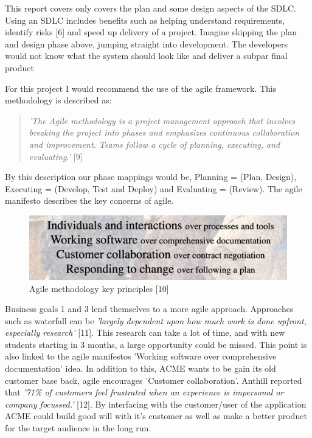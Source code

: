   This report covers only covers the plan and some design aspects of the SDLC. Using an SDLC includes benefits such as helping understand requirements,
  identify risks [6] and speed up delivery of a project. Imagine skipping the plan and design phase above, jumping straight into development. The developers
  would not know what the system should look like and deliver a subpar final product

  For this project I would recommend the use of the agile framework. This methodology is described as:
  \begin{quote}
    \textit{'The Agile methodology is a project management approach that involves breaking the project into phases and emphasizes continuous collaboration and 
    improvement. Teams follow a cycle of planning, executing, and evaluating.'} [9]
  \end{quote}

  By this description our phase mappings would be, Planning = (Plan, Design), Executing = (Develop, Test and Deploy) and Evaluating = (Review). The agile manifesto
  describes the key concerns of agile.

  \begin{figure}[H]
    \centering
    \includegraphics[width=12cm]{assets/agileManifesto.png}
    \caption{Agile methodology key principles [10]}
    \label{fig:agileManifesto}
  \end{figure}

  Business goals 1 and 3 lend themselves to a more agile approach. Approaches such as waterfall can be \textit{'largely dependent upon how much work is done 
  upfront, especially research'} [11]. This research can take a lot of time, and with new students starting in 3 months, a large opportunity could be missed.
  This point is also linked to the agile manifestos 'Working software over comprehensive documentation' idea. In addition to this, ACME wants to be gain its
  old customer base back, agile encourages 'Customer collaboration'. Anthill reported that  \textit{'71\% of customers feel frustrated when an experience is 
  impersonal or company focussed.'} [12]. By interfacing with the customer/user of the application ACME could build good will with it's customer as well as 
  make a better product for the target audience in the long run.
\newpage